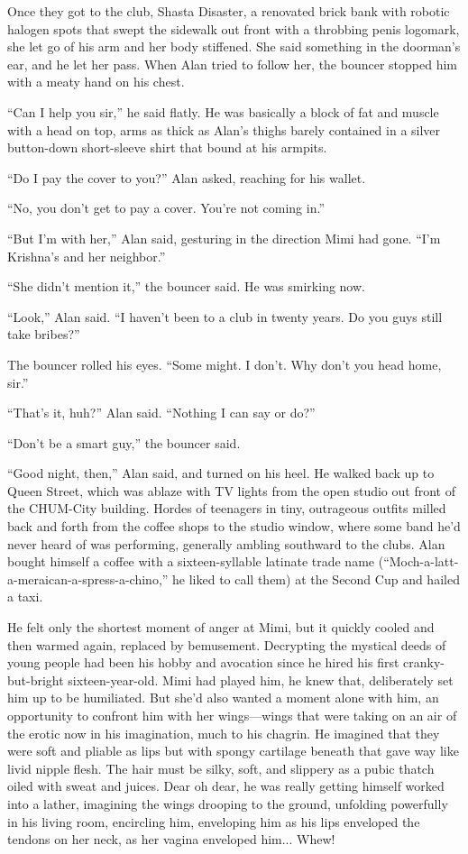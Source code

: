 \documentclass{article}
\begin{document}
Once they got to the club, Shasta Disaster, a renovated brick bank
with robotic halogen spots that swept the sidewalk out front with a
throbbing penis logomark, she let go of his arm and her body
stiffened.  She said something in the doorman's ear, and he let her
pass.  When Alan tried to follow her, the bouncer stopped him with a
meaty hand on his chest.

``Can I help you sir,'' he said flatly.  He was basically a block of
fat and muscle with a head on top, arms as thick as Alan's thighs
barely contained in a silver button-down short-sleeve shirt that bound
at his armpits.

``Do I pay the cover to you?'' Alan asked, reaching for his wallet.

``No, you don't get to pay a cover.  You're not coming in.''

``But I'm with her,'' Alan said, gesturing in the direction Mimi had
gone.  ``I'm Krishna's and her neighbor.''

``She didn't mention it,'' the bouncer said.  He was smirking now.

``Look,'' Alan said.  ``I haven't been to a club in twenty years.  Do
you guys still take bribes?''

The bouncer rolled his eyes.  ``Some might.  I don't.  Why don't you
head home, sir.''

``That's it, huh?'' Alan said.  ``Nothing I can say or do?''

``Don't be a smart guy,'' the bouncer said.

``Good night, then,'' Alan said, and turned on his heel.  He walked
back up to Queen Street, which was ablaze with TV lights from the open
studio out front of the CHUM-City building.  Hordes of teenagers in
tiny, outrageous outfits milled back and forth from the coffee shops
to the studio window, where some band he'd never heard of was
performing, generally ambling southward to the clubs.  Alan bought
himself a coffee with a sixteen-syllable latinate trade name
(``Moch-a-latt-a-meraican-a-spress-a-chino,'' he liked to call them)
at the Second Cup and hailed a taxi.

He felt only the shortest moment of anger at Mimi, but it quickly
cooled and then warmed again, replaced by bemusement.  Decrypting the
mystical deeds of young people had been his hobby and avocation since
he hired his first cranky-but-bright sixteen-year-old.  Mimi had
played him, he knew that, deliberately set him up to be humiliated. 
But she'd also wanted a moment alone with him, an opportunity to
confront him with her wings---wings that were taking on an air of the
erotic now in his imagination, much to his chagrin.  He imagined that
they were soft and pliable as lips but with spongy cartilage beneath
that gave way like livid nipple flesh.  The hair must be silky, soft,
and slippery as a pubic thatch oiled with sweat and juices.  Dear oh
dear, he was really getting himself worked into a lather, imagining
the wings drooping to the ground, unfolding powerfully in his living
room, encircling him, enveloping him as his lips enveloped the tendons
on her neck, as her vagina enveloped him...  Whew!
\end{document}
